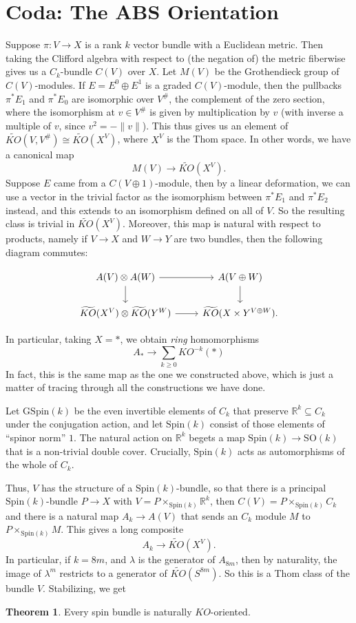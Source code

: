 \documentclass{shortart}
\theoremstyle{definition}
\newtheorem*{thm}{Theorem}
\newcommand\R{\mathbb{R}}
\newcommand\SO{\mathrm{SO}}
\newcommand\Spin{\mathrm{Spin}}
\newcommand\GSpin{\mathrm{GSpin}}
\begin{document}
\newpage
\section{Coda: The ABS Orientation}
Suppose $\pi: V \to X$ is a rank $k$ vector bundle with a Euclidean metric. Then taking the Clifford algebra with respect to (the negation of) the metric fiberwise gives us a $C_k$-bundle $C(V)$ over $X$. Let $M(V)$ be the Grothendieck group of $C(V)$-modules. If $E = E^0 \oplus E^1$ is a graded $C(V)$-module, then the pullbacks $\pi^* E_1$ and $\pi^* E_0$ are isomorphic over $V^\#$, the complement of the zero section, where the isomorphism at $v \in V^\#$ is given by multiplication by $v$ (with inverse a multiple of $v$, since $v^2 = -\|v\|$). This thus gives us an element of $\widetilde{KO}(V, V^\#) \cong \widetilde{KO}(X^V)$, where $X^V$ is the Thom space. In other words, we have a canonical map
\[
  M(V) \to \widetilde{KO}(X^V).
\]
Suppose $E$ came from a $C(V \oplus 1)$-module, then by a linear deformation, we can use a vector in the trivial factor as the isomorphism between $\pi^*E_1$ and $\pi^*E_2$ instead, and this extends to an isomorphism defined on all of $V$. So the resulting class is trivial in $\widetilde{KO}(X^V)$. Moreover, this map is natural with respect to products, namely if $V \to X$ and $W \to Y$ are two bundles, then the following diagram commutes:
\begin{useimager}
  \[
    \begin{tikzcd}
      A(V) \otimes A(W) \ar[d] \ar[r] & A (V \oplus W) \ar[d]\\
      \widetilde{KO}(X^V) \otimes \widetilde{KO}(Y^W) \ar[r] & \widetilde{KO}(X \times Y^{V \oplus W}).
    \end{tikzcd}
  \]
\end{useimager}
In particular, taking $X = *$, we obtain \emph{ring} homomorphisms
\[
  A_* \to \sum_{k \geq 0} KO^{-k}(*)
\]
In fact, this is the same map as the one we constructed above, which is just a matter of tracing through all the constructions we have done.

Let $\GSpin(k)$ be the even invertible elements of $C_k$ that preserve $\R^k \subseteq C_k$ under the conjugation action, and let $\Spin(k)$ consist of those elements of ``spinor norm'' $1$. The natural action on $\R^k$ begets a map $\Spin(k) \to \SO(k)$ that is a non-trivial double cover. Crucially, $\Spin(k)$ acts as automorphisms of the whole of $C_k$.

Thus, $V$ has the structure of a $\Spin(k)$-bundle, so that there is a principal $\Spin(k)$-bundle $P \to X$ with $V = P \times_{\Spin(k)} \R^k$, then $C(V) = P \times_{\Spin(k)} C_k$ and there is a natural map $A_k \to A(V)$ that sends an $C_k$ module $M$ to $P \times_{\Spin(k)} M$. This gives a long composite
\[
  A_k \to \widetilde{KO}(X^V).
\]
In particular, if $k = 8m$, and $\lambda$ is the generator of $A_{8m}$, then by naturality, the image of $\lambda^m$ restricts to a generator of $\widetilde{KO}(S^{8m})$. So this is a Thom class of the bundle $V$. Stabilizing, we get

\begin{thm}
  Every spin bundle is naturally $KO$-oriented.
\end{thm}



\end{document}
